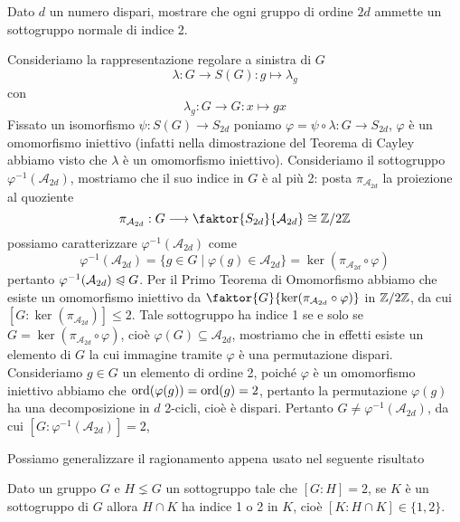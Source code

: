 \documentclass[11pt]{scrartcl}
\begin{document}
\begin{exercise}
    \label{ex1.0}
    Dato $d$ un numero dispari, mostrare che ogni gruppo di ordine $2d$ ammette
    un sottogruppo normale di indice 2.
\end{exercise}

\begin{soln}
    Consideriamo la rappresentazione regolare a sinistra di $G$
    \[
        \lambda: G \longrightarrow S(G) : g\longmapsto \lambda_g
    \]
    con
    \[
        \lambda_g : G\longrightarrow G : x\longmapsto gx
    \]
    Fissato un isomorfismo $\psi: S(G) \longrightarrow S_{2d}$ poniamo
    $\varphi = \psi\circ\lambda :G\longrightarrow S_{2d}$, $\varphi$ è 
    un omomorfismo iniettivo (infatti nella dimostrazione del Teorema di Cayley
    abbiamo visto che $\lambda$ è un omomorfismo iniettivo). Consideriamo 
    il sottogruppo $\varphi^{-1}(\mathcal{A}_{2d})$, mostriamo che il suo 
    indice in $G$ è al più 2:
    posta $\pi_{\mathcal{A}_{2d}}$ la proiezione al quoziente
    \[
        \pi_{\mathcal{A}_{2d}}:G\longrightarrow \faktor{S_{2d}}{\mathcal{A}_{2d}}\cong \Z2
    \]
    possiamo caratterizzare $\varphi^{-1}(\mathcal{A}_{2d})$ come
    \[
        \varphi^{-1}(\mathcal{A}_{2d}) = \{g \in G \mid \varphi(g) \in \mathcal{A}_{2d}\}
        = \ker (\pi_{\mathcal{A}_{2d}}\circ\varphi)
    \]
    pertanto $\varphi^{-1}(\mathcal{A}_{2d})\trianglelefteqslant G$. 
    Per il Primo Teorema di Omomorfismo abbiamo che esiste un omomorfismo
    iniettivo da $\faktor{G}{\ker(\pi_{\mathcal{A}_{2d}}\circ\varphi)}$ in
    $\mathbb{Z}/{2}\mathbb{Z}$, da cui $[G:\ker(\pi_{\mathcal{A}_{2d}})] \leq 2$. Tale 
    sottogruppo ha indice 1 se e solo se $G = \ker(\pi_{\mathcal{A}_{2d}}\circ\varphi)$,
    cioè $\varphi(G) \subseteq \mathcal{A}_{2d}$, mostriamo che in effetti esiste 
    un elemento di $G$ la cui immagine tramite $\varphi$ è una permutazione 
    dispari. Consideriamo $g \in G$ un elemento di ordine 2, poiché $\varphi$
    è un omomorfismo iniettivo abbiamo che $\operatorname{ord}(\varphi(g)) = \operatorname{ord}(g) = 2$,
    pertanto la permutazione $\varphi(g)$ ha una decomposizione in $d$ 2-cicli,
    cioè è dispari. Pertanto $G \neq \varphi^{-1}(\mathcal{A}_{2d})$,
    da cui $[G: \varphi^{-1}(\mathcal{A}_{2d})] = 2$,
\end{soln}

Possiamo generalizzare il ragionamento appena usato nel seguente risultato

\begin{proposition}
    \label{prop2.0}
    Dato un gruppo $G$ e $H\lneq G$ un sottogruppo tale che $[G:H] = 2$, se
    $K$ è un sottogruppo di $G$ allora $H\cap K$ ha indice 1 o 2 in $K$,
    cioè $[K:H\cap K] \in \{1, 2\}$.
\end{proposition}
\end{document}

